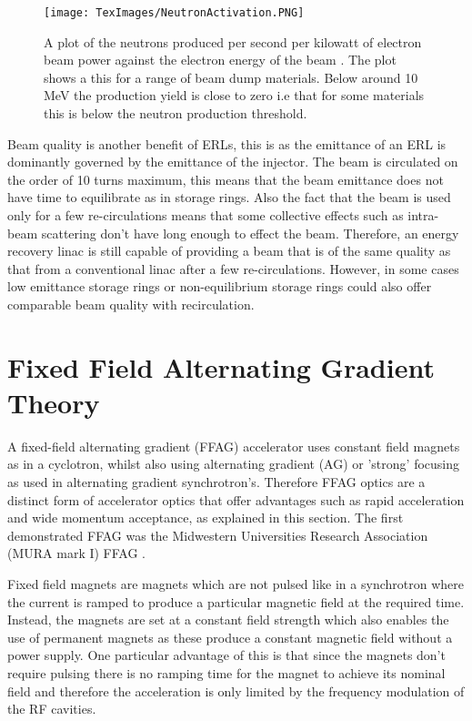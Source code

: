 \documentclass[11pt]{article}
\begin{document}
\begin{figure}[H]
\centering
\texttt{[image: TexImages/NeutronActivation.PNG]}
\caption{\label{fig:neutronact} A plot of the neutrons produced per second per kilowatt of electron beam power against the electron energy of the beam \cite{neutactplot}. The plot shows a this for a range of beam dump materials. Below around 10\,MeV the production yield is close to zero i.e that for some materials this is below the neutron production threshold.}
\end{figure}

Beam quality is another benefit of ERLs, this is as the emittance of an ERL is dominantly governed by the emittance of the injector. The beam is circulated on the order of 10 turns maximum, this means that the beam emittance does not have time to equilibrate as in storage rings. Also the fact that the beam is used only for a few re-circulations means that some collective effects such as intra-beam scattering don't have long enough to effect the beam. Therefore, an energy recovery linac is still capable of providing a beam that is of the same quality as that from a conventional linac after a few re-circulations. However, in some cases low emittance storage rings or non-equilibrium storage rings \cite{NEQring} could also offer comparable beam quality with recirculation. 

\section{Fixed Field Alternating Gradient Theory}

A fixed-field alternating gradient (FFAG) accelerator uses constant field magnets as in a cyclotron, whilst also using alternating gradient (AG) or 'strong' focusing as used in alternating gradient synchrotron's. Therefore FFAG optics are a distinct form of accelerator optics that offer advantages such as rapid acceleration and wide momentum acceptance, as explained in this section. The first demonstrated FFAG was the Midwestern Universities Research Association (MURA mark I) FFAG \cite{MURAmarkI}.   

Fixed field magnets are magnets which are not pulsed like in a synchrotron where the current is ramped to produce a particular magnetic field at the required time. Instead, the magnets are set at a constant field strength which also enables the use of permanent magnets as these produce a constant magnetic field without a power supply. One particular advantage of this is that since the magnets don't require pulsing there is no ramping time for the magnet to achieve its nominal field and therefore the acceleration is only limited by the frequency modulation of the RF cavities.
\end{document}
